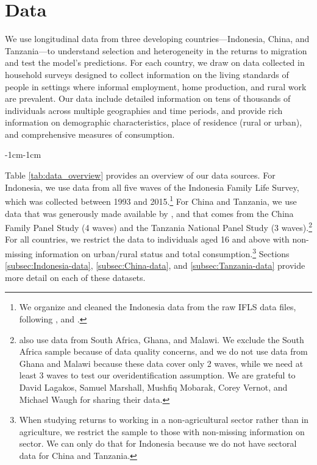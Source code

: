 \section{Data}\label{sec:data}

We use longitudinal data from three developing countries---Indonesia, China, and Tanzania---to understand selection and heterogeneity in the returns to migration and test the model's predictions.
For each country, we draw on data collected in household surveys designed to collect information on the living standards of people in settings where informal employment, home production, and rural work are prevalent. 
Our data include detailed information on tens of thousands of individuals across multiple geographies and time periods, and provide rich information on demographic characteristics,  place of residence (rural or urban), and comprehensive measures of consumption.%



\begin{table}[htbp]
    \begin{adjustwidth}{-1cm}{-1cm}
        \centering
        
        \caption{Overview of Data Sources}\label{tab:data_overview}
    \end{adjustwidth}
\end{table}

Table \ref{tab:data_overview} provides an overview of our data sources. For Indonesia, we use data from all five waves of the Indonesia Family Life Survey, which was collected between 1993 and 2015.\footnote{We organize and cleaned the Indonesia data from the raw IFLS data files, following \cite{kleemansLabourMarketResponses2018}, \cite{hamoryReevaluatingAgriculturalProductivity2021} and \cite{kleemansMigrationChoiceRisk}.} For China and Tanzania, we use data that was generously made available by \cite{lagakosMigrationCostsObservational2020}, and that comes from the China Family Panel Study (4 waves) and the Tanzania National Panel Study (3 waves).\footnote{\cite{lagakosMigrationCostsObservational2020} also use data from South Africa, Ghana, and Malawi. We exclude the South Africa sample because of data quality concerns, and we do not use data from Ghana and Malawi because these data cover only 2 waves, while we need at least 3 waves to test our overidentification assumption. We are grateful to David Lagakos, Samuel Marshall, Mushfiq Mobarak, Corey Vernot, and Michael Waugh for sharing their data.}
For all countries, we restrict the data to individuals aged 16 and above with non-missing information on urban/rural status and total consumption.\footnote{When studying returns to working in a non-agricultural sector rather than in agriculture, we restrict the sample to those with non-missing information on sector. We can only do that for Indonesia because we do not have sectoral data for China and Tanzania.} Sections \ref{subsec:Indonesia-data}, \ref{subsec:China-data}, and \ref{subsec:Tanzania-data} provide more detail on each of these datasets. 

